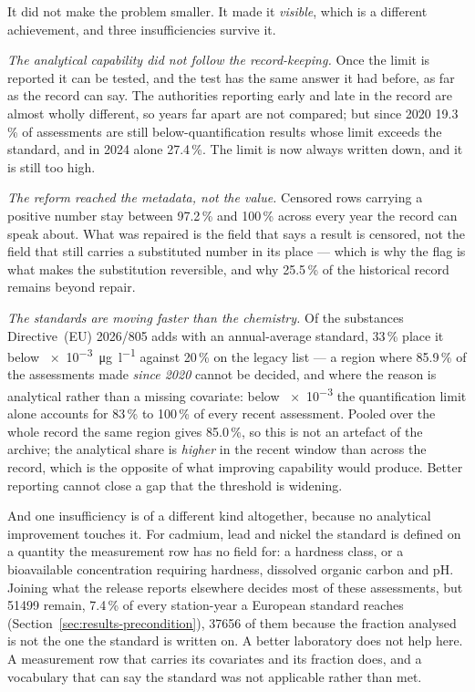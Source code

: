 It did not make the problem smaller. It made it \emph{visible}, which is a
different achievement, and three insufficiencies survive it.

\emph{The analytical capability did not follow the record-keeping.} Once the
limit is reported it can be tested, and the test has the same answer it had
before, as far as the record can say. The authorities reporting early and late
in the record are almost wholly different, so years far apart are not compared;
but since \num{2020} \num{19.3}\,\% of assessments are still below-quantification
results whose limit exceeds the standard, and in \num{2024} alone
\num{27.4}\,\%. The limit is now always written down, and it is still too high.

\emph{The reform reached the metadata, not the value.} Censored rows carrying a
positive number stay between \num{97.2}\,\% and \num{100}\,\% across every year
the record can speak about. What was repaired is the field that says a result is
censored, not the field that still carries a substituted number in its place ---
which is why the flag is what makes the substitution reversible, and why
\num{25.5}\,\% of the historical record remains beyond repair.

\emph{The standards are moving faster than the chemistry.} Of the substances
Directive~(EU) 2026/805 adds with an annual-average standard, \num{33}\,\% place
it below \num{e-3}~\si{\micro\gram\per\litre} against \num{20}\,\% on the
legacy list --- a region where \num{85.9}\,\% of the assessments made
\emph{since \num{2020}} cannot be decided, and where the reason is analytical
rather than a missing covariate: below \num{e-3} the quantification limit alone
accounts for \num{83}\,\% to \num{100}\,\% of every recent
assessment. Pooled over the whole
record the same region gives \num{85.0}\,\%, so this is not an artefact of the
archive; the analytical share is \emph{higher} in the recent window than across
the record, which is the opposite of what improving capability would produce. Better reporting cannot
close a gap that the threshold is widening.

And one insufficiency is of a different kind altogether, because no analytical
improvement touches it. For cadmium, lead and nickel the standard is defined on a
quantity the measurement row has no field for: a hardness class, or a
bioavailable concentration requiring hardness, dissolved organic carbon and pH.
Joining what the release reports elsewhere decides most of these assessments, but
\num{51499} remain, \num{7.4}\,\% of every station-year a European standard
reaches (Section~\ref{sec:results-precondition}), \num{37656} of them because the
fraction analysed is not the one the standard is written on. A better laboratory
does not help here. A measurement row that carries its covariates and its
fraction does, and a vocabulary that can say the standard was not applicable
rather than met.

